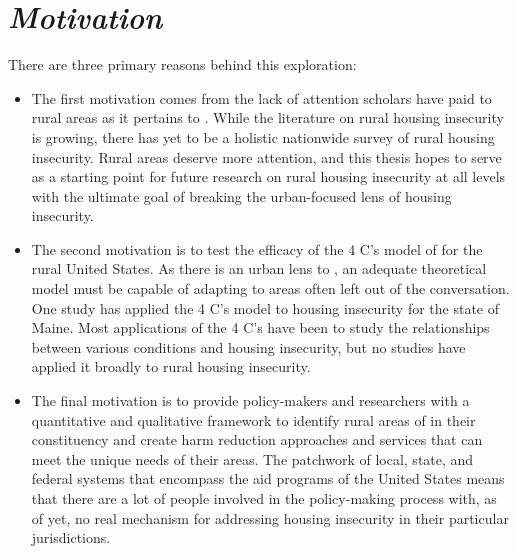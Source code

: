 \section{\textit{Motivation}}
There are three primary reasons behind this exploration:
\begin{itemize}
    \item{The first motivation comes from the lack of attention scholars have paid to rural areas as it pertains to \hs. While the literature on rural housing insecurity is growing, there has yet to be a holistic nationwide survey of rural housing insecurity. Rural areas deserve more attention, and this thesis hopes to serve as a starting point for future research on rural housing insecurity at all levels with the ultimate goal of breaking the urban-focused lens of housing insecurity.}
    \item{The second motivation is to test the efficacy of the 4 C's model of \hs for the rural United States. As there is an urban lens to \hs, an adequate theoretical model must be capable of adapting to areas often left out of the conversation. One study \citep{gleason_using_2021} has applied the 4 C's model to housing insecurity for the state of Maine. Most applications of the 4 C's have been to study the relationships between various conditions and housing insecurity, but no studies have applied it broadly to rural housing insecurity.}
    \item{The final motivation is to provide policy-makers and researchers with a quantitative and qualitative framework to identify rural areas of \hs in their constituency and create harm reduction approaches and services that can meet the unique needs of their areas. The patchwork of local, state, and federal systems that encompass the aid programs of the United States means that there are a lot of people involved in the policy-making process with, as of yet, no real mechanism for addressing housing insecurity in their particular jurisdictions.}

\end{itemize}

